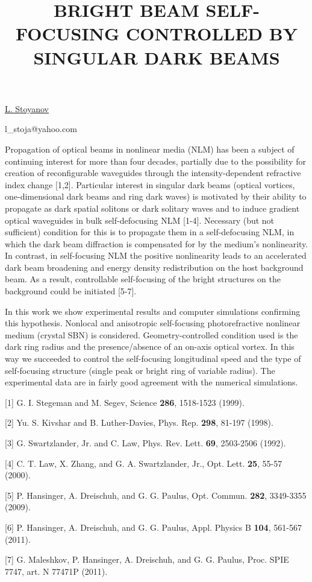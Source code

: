 \title{BRIGHT BEAM SELF-FOCUSING CONTROLLED BY SINGULAR DARK BEAMS}

\underline{L. Stoyanov} 

{\normalsize{\vspace{-4mm}

\unisofia

\email l\_stoja@yahoo.com}}

Propagation of optical beams in nonlinear media (NLM) has been a subject of continuing interest for more than four decades, partially due to the possibility for creation of reconfigurable waveguides through the intensity-dependent refractive index change [1,2]. Particular interest in singular dark beams (optical vortices, one-dimensional dark beams and ring dark waves) is motivated by their ability to propagate as dark spatial solitons or dark solitary waves and to induce gradient optical waveguides in bulk self-defocusing NLM [1-4]. Necessary (but not sufficient) condition for this is to propagate them in a self-defocusing NLM, in which the dark beam diffraction is compensated for by the medium's nonlinearity. In contrast, in self-focusing NLM  the positive nonlinearity leads to an accelerated dark beam broadening and energy density redistribution on the host background beam. As a result, controllable self-focusing of the bright structures on the background could be initiated [5-7].

In this work we show experimental results and computer simulations confirming this hypothesis. Nonlocal and anisotropic self-focusing photorefractive nonlinear medium (crystal SBN) is considered. Geometry-controlled condition used is the dark ring radius and the presence/absence of an on-axis optical vortex. In this way we succeeded to control the self-focusing longitudinal speed and the type of self-focusing structure (single peak or bright ring of variable radius). The experimental data are in fairly good agreement with the numerical simulations.

{\normalsize
[1] G. I. Stegeman and M. Segev, Science \textbf{286}, 1518-1523 (1999).
\vsp

[2] Yu. S. Kivshar and B. Luther-Davies, Phys. Rep. \textbf{298}, 81-197 (1998).
\vsp

[3] G. Swartzlander, Jr. and C. Law, Phys. Rev. Lett. \textbf{69}, 2503-2506 (1992).
\vsp

[4] C. T. Law, X. Zhang, and G. A. Swartzlander, Jr., Opt. Lett. \textbf{25}, 55-57 (2000).
\vsp

[5] P. Hansinger, A. Dreischuh, and G. G. Paulus, Opt. Commun. \textbf{282}, 3349-3355 (2009).
\vsp

[6] P. Hansinger, A. Dreischuh, and G. G. Paulus, Appl. Physics B \textbf{104}, 561-567 (2011).
\vsp

[7] G. Maleshkov, P. Hansinger, A. Dreischuh, and G. G. Paulus, Proc. SPIE 7747, art. N 77471P (2011).
}

\vspace{\baselineskip}
